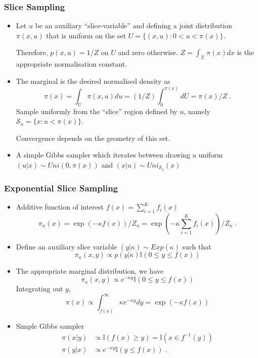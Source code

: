 \documentclass[notes=show,smaller]{beamer}
\begin{document}
\begin{frame}
\frametitle{Slice Sampling}

\footnotesize
\begin{itemize}
\item Let $u$ be an auxiliary ``slice-variable'' and defining a joint distribution $ \pi(x,u)$ that is uniform
on the set $ U = \{ ( x , u) : 0 < u < \pi(x) \} $.

Therefore, $ p ( x , u) = 1 / Z $ on $U$ and zero otherwise. $ Z = \int_{\mathcal{X}} \pi(x ) d x $ is the appropriate normalisation constant.
\item The marginal is the desired normalised density as
$$
\pi(x) = \int_U \pi(x,u) d u = (1 / Z ) \int_0^{\pi(x)} d U = \pi(x)/Z  \; .
$$
Sample uniformly from the ``slice'' region defined by $u$, namely
$ \mathcal{S}_u = \{ x : u < \pi(x) \} $.

Convergence depends on the geometry of this set.
\item
A simple Gibbs sampler which iterates between drawing a uniform $ (u|x) \sim Uni ( 0, \pi(x) ) $
and $ (x|u) \sim Uni_{ \mathcal{S}_u } ( x ) $
\end{itemize}
\normalsize

\end{frame}
\begin{frame}
\frametitle{Exponential Slice Sampling}

\footnotesize
\begin{itemize}
\item Additive function of interest $ f(x) = \sum_{i=1}^K f_i (x) $
$$
\pi_\kappa ( x ) = \exp \left ( - \kappa f (x) \right )/ Z_\kappa  = \exp \left ( - \kappa \sum_{i=1}^K f_i (x) \right ) / Z_\kappa \;.
$$
\item Define an auxiliary slice  variable $ (y | \kappa ) \sim Exp ( \kappa )$ such that
$$
\pi_\kappa (  x , y ) \propto p(y|\kappa) \mathbb{I}\left ( 0 \leq y \leq f(x) \right )
$$
\item
The appropriate marginal distribution, we have
$$
\pi_\kappa ( x , y ) \propto e^{ - \kappa y } \mathbb{I}\left ( 0 \leq y \leq f(x) \right )
$$
Integrating out $y$,
$$
\pi( x )  \propto \int_{f(x)}^\infty \kappa e^{-\kappa y} d y = \exp \left ( - \kappa f (x) \right )
$$
\item Simple Gibbs sampler
\begin{align*}
\pi( x|y ) & \propto \mathbb{I}\left ( f(x) \geq y \right ) =  \mathbb{I}\left ( x \in f^{-1} ( y ) \right )  \\
\pi( y|x ) & \propto e^{-\kappa y} \mathbb{I}\left ( y \leq f(x) \right ) \; .
\end{align*}
\end{itemize}
\normalsize

\end{frame}
\end{document}
